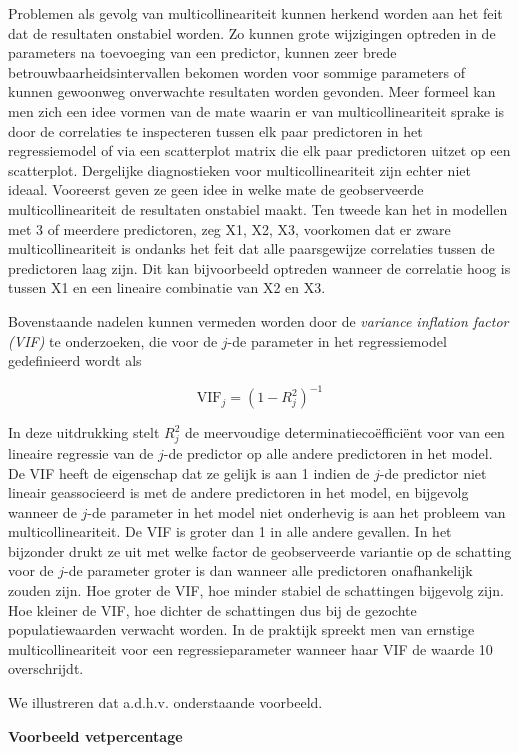 \documentclass[
  12pt,dutch]{book}
\theoremstyle{definition}
\theoremstyle{definition}
\theoremstyle{definition}
\theoremstyle{definition}
\theoremstyle{remark}
\begin{document}
Problemen als gevolg van multicollineariteit kunnen herkend worden aan het feit dat de resultaten onstabiel worden. Zo kunnen grote wijzigingen optreden in de parameters na toevoeging van een predictor, kunnen zeer brede betrouwbaarheidsintervallen bekomen worden voor sommige parameters of kunnen gewoonweg onverwachte resultaten worden gevonden. Meer formeel kan men zich een idee vormen van de mate waarin er van multicollineariteit sprake is door de correlaties te inspecteren tussen elk paar predictoren in het regressiemodel of via een scatterplot matrix die elk paar predictoren uitzet op een scatterplot.
Dergelijke diagnostieken voor multicollineariteit zijn echter niet ideaal.
Vooreerst geven ze geen idee in welke mate de geobserveerde multicollineariteit de resultaten onstabiel maakt.
Ten tweede kan het in modellen met 3 of meerdere predictoren, zeg X1, X2, X3, voorkomen dat er zware multicollineariteit is ondanks het feit dat alle paarsgewijze correlaties tussen de predictoren laag zijn.
Dit kan bijvoorbeeld optreden wanneer de correlatie hoog is tussen X1 en een lineaire combinatie van X2 en X3.

Bovenstaande nadelen kunnen vermeden worden door de \textit{variance inflation factor (VIF)} te onderzoeken, die voor de \(j\)-de parameter in het regressiemodel gedefinieerd wordt als

\[
\textrm{VIF}_j=\left(1-R_j^2\right)^{-1}
\]

In deze uitdrukking stelt \(R_j^2\) de meervoudige determinatiecoëfficiënt voor van een lineaire regressie van de \(j\)-de predictor op alle andere predictoren in het model. De VIF heeft de eigenschap dat ze gelijk is aan 1 indien de \(j\)-de predictor niet lineair geassocieerd is met de andere predictoren in het model, en bijgevolg wanneer de \(j\)-de parameter in het model niet onderhevig is aan het probleem van multicollineariteit. De VIF is groter dan 1 in alle andere gevallen. In het bijzonder drukt ze uit met welke factor de geobserveerde variantie op de schatting voor de \(j\)-de parameter groter is dan wanneer alle predictoren onafhankelijk zouden zijn. Hoe groter de VIF, hoe minder stabiel de schattingen bijgevolg zijn. Hoe kleiner de VIF, hoe dichter de schattingen dus bij de gezochte populatiewaarden verwacht worden. In de praktijk spreekt men van ernstige multicollineariteit voor een regressieparameter wanneer haar VIF de waarde 10 overschrijdt.

We illustreren dat a.d.h.v. onderstaande voorbeeld.

\textbf{Voorbeeld vetpercentage}
\end{document}
